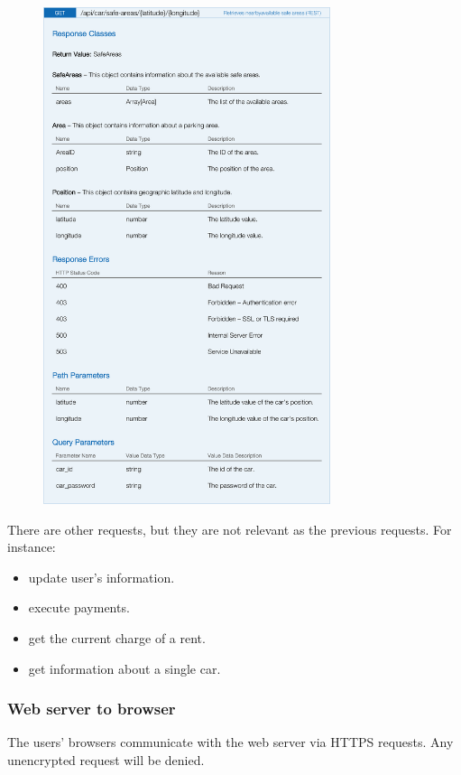\begin{figure}[H]
	\noindent
    	\centering
    	\includegraphics[height=550px, keepaspectratio]{apitables/APISafeAreas.png}
    	\label{fig:api-safe-areas}
\end{figure}


There are other requests, but they are not relevant as the previous requests. For instance:

\begin{itemize}
	\item update user's information.
	\item execute payments.
	\item get the current charge of a rent.
	\item get information about a single car.
\end{itemize}

\subsubsection{Web server to browser}

The users' browsers communicate with the web server via HTTPS requests. Any unencrypted request will be denied.

